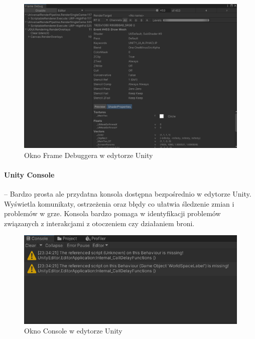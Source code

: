 \begin{figure}[h]
        \centering
        \includegraphics[width=0.9\linewidth]{Images/frameDebug.png}
        \caption{Okno Frame Debuggera w edytorze Unity}
\end{figure}
\FloatBarrier
\paragraph{Unity Console}\hspace{-1em} -- Bardzo prosta ale przydatna konsola dostępna bezpośrednio w edytorze Unity. Wyświetla komunikaty, ostrzeżenia oraz błędy co ułatwia śledzenie zmian i problemów w grze. Konsola bardzo pomaga w identyfikacji problemów związanych z interakcjami z otoczeniem czy działaniem broni.

\begin{figure}[h]
        \centering
        \includegraphics[width=0.9\linewidth]{Images/console.png}
        \caption{Okno Console w edytorze Unity}
\end{figure}
\FloatBarrier